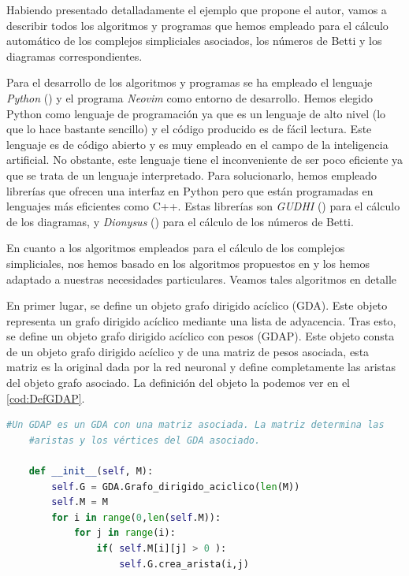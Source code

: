 \documentclass[12pt, a4paper, twoside]{book}
\numberwithin{equation}{section}
\theoremstyle{definition}
\theoremstyle{remark}
\theoremstyle{plain}
\begin{document}
	Habiendo presentado detalladamente el ejemplo que propone el autor, 
	vamos a describir todos los algoritmos y programas que hemos empleado
	para el cálculo automático de los complejos simpliciales asociados, 
	los números de Betti y los diagramas correspondientes.

	Para el desarrollo de los algoritmos y programas se ha empleado el 
	lenguaje \emph{Python} (\cite{10.5555/1593511}) y el programa 
	\emph{Neovim} como entorno de desarrollo. Hemos elegido Python como 
	lenguaje de programación ya que es un lenguaje de alto nivel (lo que 
	lo hace bastante sencillo) y el código producido es de fácil lectura. 
	Este lenguaje es de código abierto y es muy empleado en el campo de la 
	inteligencia artificial. No obstante, este lenguaje tiene el 
	inconveniente de ser poco eficiente ya que se trata de un lenguaje 
	interpretado. Para solucionarlo, hemos empleado librerías que ofrecen 
	una interfaz en Python pero que están programadas en lenguajes más 
	eficientes como C++. Estas librerías son \emph{GUDHI} 
	(\cite{gudhi:urm}) para el cálculo de los diagramas, y \emph{Dionysus} 
	(\cite{morozov_2021}) para el cálculo de los números de Betti.

	En cuanto a los algoritmos empleados para el cálculo de los complejos
	simpliciales, nos hemos basado en los algoritmos propuestos en 
	\cite{Algoritmos-Sedgewick} y los hemos adaptado a nuestras 
	necesidades particulares. Veamos tales algoritmos en detalle

	En primer lugar, se define un objeto grafo dirigido acíclico (GDA). 
	Este objeto representa un grafo dirigido acíclico mediante una lista 
	de adyacencia. Tras esto, se define un objeto grafo dirigido acíclico 
	con pesos (GDAP). Este objeto consta de un objeto grafo dirigido 
	acíclico y de una matriz de pesos asociada, esta matriz es la original 
	dada por la red neuronal y define completamente las aristas del objeto 
	grafo asociado. La definición del objeto la podemos ver en 
	el \autoref{cod:DefGDAP}.

	\begin{lstlisting}[language=Python, float=htbp, label=cod:DefGDAP, caption= 
	Definición del objeto GDAP.]
	#Un GDAP es un GDA con una matriz asociada. La matriz determina las 
	#aristas y los vértices del GDA asociado.
    	
	def __init__(self, M):
        self.G = GDA.Grafo_dirigido_aciclico(len(M))
        self.M = M
        for i in range(0,len(self.M)):
            for j in range(i):
                if( self.M[i][j] > 0 ):
                    self.G.crea_arista(i,j)
		    
	\end{lstlisting}
\end{document}
